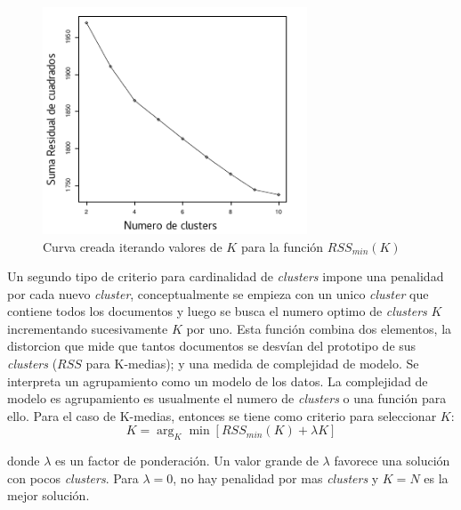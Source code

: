     \begin{figure}[!htbp]
        \centering
        \includegraphics[width=0.7\textwidth]{Figuras/codo.png}
        \caption{Curva creada iterando valores de $K$ para la función $RSS_{min}(K)$}
        \label{fig:codo}
      \end{figure}

    Un segundo tipo de criterio para cardinalidad de \textit{clusters} impone una penalidad por cada nuevo \textit{cluster}, conceptualmente se empieza con un unico \textit{cluster} que contiene todos los documentos y luego se busca el numero optimo de \textit{clusters} $K$ incrementando sucesivamente $K$ por uno. Esta función combina dos elementos, la distorcion que mide que tantos documentos se desvían del prototipo de sus \textit{clusters} ($RSS$ para K-medias); y una medida de complejidad de modelo. Se interpreta un agrupamiento como un modelo de los datos. La complejidad de modelo es agrupamiento es usualmente el numero de \textit{clusters} o una función para ello. Para el caso de K-medias, entonces se tiene como criterio para seleccionar $K$:
      \begin{equation} \label{eq:criterio2} 
        K = \arg_K \min[{RSS_{min}(K)+\lambda K}]
      \end{equation}

    donde $\lambda$ es un factor de ponderación. Un valor grande de $\lambda$ favorece una solución con pocos \textit{clusters}. Para $\lambda = 0$, no hay penalidad por mas \textit{clusters} y $K=N$ es la mejor solución.\cite{informationretrieval}

      


